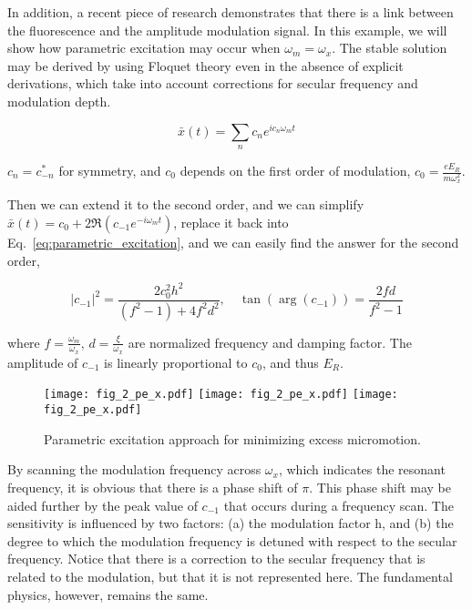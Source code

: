 In addition, a recent piece of research demonstrates that there is a link between the fluorescence and the amplitude modulation signal. In this example, we will show how parametric excitation may occur when \(\omega_m=\omega_x\). The stable solution may be derived by using Floquet theory even in the absence of explicit derivations, which take into account corrections for secular frequency and modulation depth.

\begin{equation}
    \bar{x}(t)=\sum_nc_ne^{ic_n\omega_mt}
\end{equation}

\(c_n=c_{-n}^*\) for symmetry, and \(c_0\) depends on the first order of modulation, \(c_0=\frac{eE_R}{m\omega_x^2}\).

Then we can extend it to the second order, and we can simplify $\bar{x}(t)=c_0+2 \Re\left(c_{-1} e^{-i \omega_m t}\right)$, replace it back into Eq.~\ref{eq:parametric_excitation}, and we can easily find the answer for the second order,

\begin{equation}
    |c_{-1}|^2=\frac{2 c_0^2 h^2}{\left(f^2-1\right)+4 f^2 d^2}, \quad \tan \left(\arg \left(c_{-1}\right)\right)=\frac{2 f d}{f^2-1}
\end{equation}

where \(f=\frac{\omega_m}{\omega_x},\, d=\frac{\xi}{\omega_x}\) are normalized frequency and damping factor. The amplitude of \(c_{-1}\) is linearly proportional to \(c_0\), and thus \(E_R\).

\begin{figure}
    \centering
    {\texttt{[image: fig\_2\_pe\_x.pdf]}}
    {\texttt{[image: fig\_2\_pe\_x.pdf]}}
    {\texttt{[image: fig\_2\_pe\_x.pdf]}}
    \caption{Parametric excitation approach for minimizing excess micromotion.}
    \label{fig:fig_2_pe}
\end{figure}

By scanning the modulation frequency across \(\omega_x\), which indicates the resonant frequency, it is obvious that there is a phase shift of \(\pi\). This phase shift may be aided further by the peak value of \(c_{-1}\) that occurs during a frequency scan. The sensitivity is influenced by two factors: (a) the modulation factor h, and (b) the degree to which the modulation frequency is detuned with respect to the secular frequency. Notice that there is a correction to the secular frequency that is related to the modulation, but that it is not represented here. The fundamental physics, however, remains the same.




